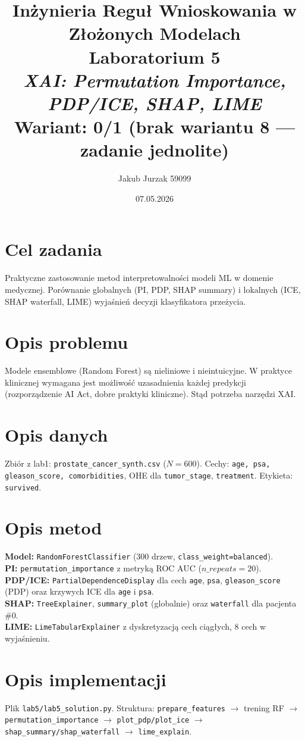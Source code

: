 \documentclass[12pt,a4paper]{article}
\title{
  \vspace{2cm}
  \LARGE\textbf{Inżynieria Reguł Wnioskowania w Złożonych Modelach}\\[0.6cm]
  \Large Laboratorium 5\\[0.4cm]
  \large \textit{XAI: Permutation Importance, PDP/ICE, SHAP, LIME}\\[0.3cm]
  \normalsize Wariant: \textbf{0/1 (brak wariantu 8 — zadanie jednolite)}
}
\author{Jakub Jurzak 59099}
\date{07.05.2026}
\begin{document}
\maketitle
\thispagestyle{empty}
\newpage

\tableofcontents
\newpage

\section{Cel zadania}
Praktyczne zastosowanie metod interpretowalności modeli ML w domenie medycznej. Porównanie globalnych (PI, PDP, SHAP summary) i lokalnych (ICE, SHAP waterfall, LIME) wyjaśnień decyzji klasyfikatora przeżycia.

\section{Opis problemu}
Modele ensemblowe (Random Forest) są nieliniowe i nieintuicyjne. W praktyce klinicznej wymagana jest możliwość uzasadnienia każdej predykcji (rozporządzenie AI Act, dobre praktyki kliniczne). Stąd potrzeba narzędzi XAI.

\section{Opis danych}
Zbiór z lab1: \texttt{prostate\_cancer\_synth.csv} ($N=600$). Cechy: \texttt{age, psa, gleason\_score, comorbidities}, OHE dla \texttt{tumor\_stage}, \texttt{treatment}. Etykieta: \texttt{survived}.

\section{Opis metod}
\textbf{Model:} \texttt{RandomForestClassifier} (300 drzew, \texttt{class\_weight=balanced}). \\\textbf{PI:} \texttt{permutation\_importance} z metryką ROC AUC ($n\_repeats=20$).\\\textbf{PDP/ICE:} \texttt{PartialDependenceDisplay} dla cech \texttt{age}, \texttt{psa}, \texttt{gleason\_score} (PDP) oraz krzywych ICE dla \texttt{age} i \texttt{psa}.\\\textbf{SHAP:} \texttt{TreeExplainer}, \texttt{summary\_plot} (globalnie) oraz \texttt{waterfall} dla pacjenta \#0.\\\textbf{LIME:} \texttt{LimeTabularExplainer} z dyskretyzacją cech ciągłych, 8 cech w wyjaśnieniu.

\section{Opis implementacji}
Plik \texttt{lab5/lab5\_solution.py}. Struktura: \texttt{prepare\_features} $\to$ trening RF $\to$ \texttt{permutation\_importance} $\to$ \texttt{plot\_pdp/plot\_ice} $\to$ \texttt{shap\_summary/shap\_waterfall} $\to$ \texttt{lime\_explain}.
\end{document}
